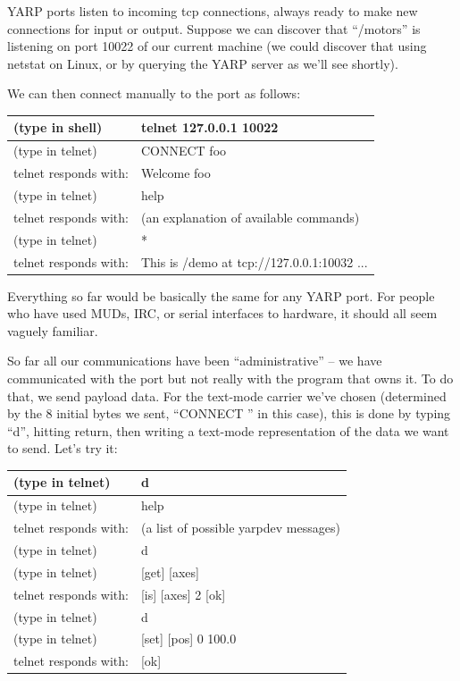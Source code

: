 YARP ports listen to incoming tcp connections, always ready to make
new connections for input or output.  Suppose we can discover that
``/motors'' is listening on port 10022 of our current machine (we could
discover that using netstat on Linux, or by querying the YARP server
as we'll see shortly).

We can then connect manually to the port as follows:

\begin{tabular}{|l|l|}
\hline
(type in shell) & telnet 127.0.0.1 10022 \\
\hline
(type in telnet) & CONNECT foo \\
\hline
telnet responds with: & Welcome foo \\
\hline
(type in telnet) & help \\
\hline
telnet responds with: & (an explanation of available commands) \\
\hline
(type in telnet) & * \\
\hline
telnet responds with: & This is /demo at tcp://127.0.0.1:10032 ... \\
\hline
\end{tabular}

Everything so far would be basically the same for any YARP port.
For people who have used MUDs, IRC, or serial interfaces to hardware,
it should all seem vaguely familiar.

So far all our communications have been ``administrative'' --
we have communicated with the port but not really with the 
program that owns it.  To do that, we send payload data.  For the
text-mode carrier we've chosen (determined by the 8 initial
bytes we sent, ``CONNECT '' in this case), this is done by typing
``d'', hitting return, then writing a text-mode representation of
the data we want to send.  Let's try it:

\begin{tabular}{|l|l|}
\hline
(type in telnet) & d \\
\hline
(type in telnet) & help \\
\hline
telnet responds with: & (a list of possible yarpdev messages)\\
\hline
(type in telnet) & d \\
\hline
(type in telnet) & [get] [axes] \\
\hline
telnet responds with: & [is] [axes] 2 [ok] \\
\hline
(type in telnet) & d \\
\hline
(type in telnet) & [set] [pos] 0 100.0 \\
\hline
telnet responds with: & [ok] \\
\hline

\end{tabular}

